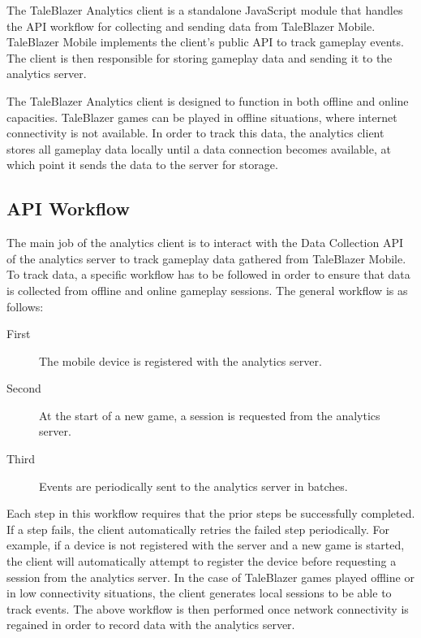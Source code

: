 The TaleBlazer Analytics client is a standalone JavaScript module that handles the API workflow for collecting and sending data from TaleBlazer Mobile. TaleBlazer Mobile implements the client's public API to track gameplay events. The client is then responsible for storing gameplay data and sending it to the analytics server.

The TaleBlazer Analytics client is designed to function in both offline and online capacities. TaleBlazer games can be played in offline situations, where internet connectivity is not available. In order to track this data, the analytics client stores all gameplay data locally until a data connection becomes available, at which point it sends the data to the server for storage.

\subsection{API Workflow}
\label{subsec:api_workflow}

The main job of the analytics client is to interact with the Data Collection API of the analytics server to track gameplay data gathered from TaleBlazer Mobile. To track data, a specific workflow has to be followed in order to ensure that data is collected from offline and online gameplay sessions. The general workflow is as follows:
\medskip
	\begin{description}
		\item[First] The mobile device is registered with the analytics server.
		\item[Second] At the start of a new game, a session is requested from the analytics server.
		\item[Third] Events are periodically sent to the analytics server in batches.
	\end{description}
\medskip

Each step in this workflow requires that the prior steps be successfully completed. If a step fails, the client automatically retries the failed step periodically. For example, if a device is not registered with the server and a new game is started, the client will automatically attempt to register the device before requesting a session from the analytics server. In the case of TaleBlazer games played offline or in low connectivity situations, the client generates local sessions to be able to track events. The above workflow is then performed once network connectivity is regained in order to record data with the analytics server.

